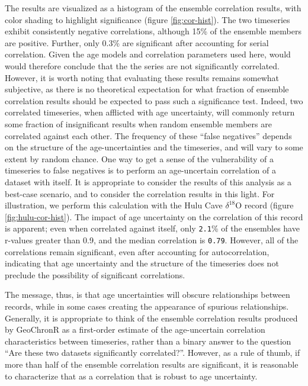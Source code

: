 \documentclass[gchron, manuscript]{copernicus}
\begin{document}
The results are visualized as a histogram of the ensemble correlation results, with color shading to highlight significance (figure \ref{fig:cor-hist}).
The two timeseries exhibit consistently negative correlations, although 15\% of the ensemble members are positive.
Further, only 0.3\% are significant after accounting for serial correlation. Given the age models and correlation parameters used here, would would therefore conclude that the the series are not significantly correlated.
However, it is worth noting that evaluating these results remains somewhat subjective, as there is no theoretical expectation for what fraction of ensemble correlation results should be expected to pass such a significance test.
Indeed, two correlated timeseries, when afflicted with age uncertainty, will commonly return some fraction of insignificant results when random ensemble members are correlated against each other.
The frequency of these ``false negatives'' depends on the structure of the age-uncertainties and the timeseries, and will vary to some extent by random chance.
One way to get a sense of the vulnerability of a timeseries to false negatives is to perform an age-uncertain correlation of a dataset with itself.
It is appropriate to consider the results of this analysis as a best-case scenario, and to consider the correlation results in this light.
For illustration, we perform this calculation with the Hulu Cave \(\delta^{18}\)O record (figure \ref{fig:hulu-cor-hist}).
The impact of age uncertainty on the correlation of this record is apparent; even when correlated against itself, only \texttt{2.1}\% of the ensembles have r-values greater than 0.9, and the median correlation is \texttt{0.79}.
However, all of the correlations remain significant, even after accounting for autocorrelation, indicating that age uncertainty and the structure of the timeseries does not preclude the possibility of significant correlations.

The message, thus, is that age uncertainties will obscure relationships between records, while in some cases creating the appearance of spurious relationships. Generally, it is appropriate to think of the ensemble correlation results produced by GeoChronR as a first-order estimate of the age-uncertain correlation characteristics between timeseries, rather than a binary answer to the question ``Are these two datasets significantly correlated?''.
However, as a rule of thumb, if more than half of the ensemble correlation results are significant, it is reasonable to characterize that as a correlation that is robust to age uncertainty.
\end{document}
